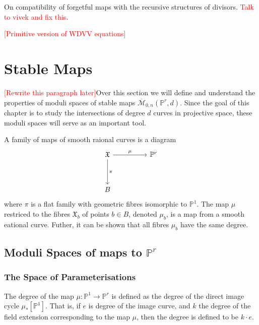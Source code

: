 \begin{remark}
    On compatibility of forgetful maps with the recursive structures of divisors. \textcolor{red}{Talk to vivek and fix this}.
\end{remark}

\textcolor{red}{[Primitive version of WDVV equations]}

\section{Stable Maps}

\textcolor{red}{[Rewrite this paragraph later]}Over this section we will define and understand the properties of moduli spaces of stable maps $\overline{\mathcal{M}}_{0,n}(\mathbb{P}^{r},d)$.
Since the goal of this chapter is to study the intersections of degree $d$ curves in projective space, these moduli spaces will serve as an important tool.

\begin{definition}
    A family of maps of smooth raional curves is a diagram
    \[
        \begin{tikzcd}
            \mathfrak{X} & & \mathbb{P}^{r}\\
            \\
            B
            \arrow["\mu", from = 1-1, to = 1-3]
            \arrow["\pi", from = 1-1, to = 3-1]
        \end{tikzcd}
    \]
    where $\pi$ is a flat family with geometric fibres isomorphic to $\mathbb{P}^{1}$.
    The map $\mu$ restriced to the fibres $\mathfrak{X}_{b}$ of points $b \in B$, denoted $\mu_{b}$, is a map from a smooth eational curve. 
    Futher, it can be shown that all fibres $\mu_{b}$ have the same degree.
\end{definition}

\subsection{Moduli Spaces of maps to $\mathbb{P}^{r}$}

\subsubsection{The Space of Parameterisations}

\begin{definition}
    The degree of the map $\mu : \mathbb{P}^{1} \to \mathbb{P}^{r}$ is defined as the degree of the direct image cycle $\mu_{*}[\mathbb{P}^{1}]$.
    That is, if $e$ is degree of the image curve, and $k$ the degree of the field extension corresponding to the map $\mu$, then the degree is defined to be $k \cdot e$.
\end{definition}

